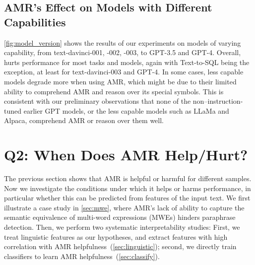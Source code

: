 \begin{figure*}[!bhtp]
\begin{minipage}[t]{0.14\textwidth}
\end{minipage}
\caption{Performance of \basemodel (in purple) and \ourmodel (in red)  on 5 datasets across  5 model versions: text-davinci-001|-002|-003,  GPT-3.5 and GPT-4.} \label{fig:model_version}
\end{figure*}
\subsection{AMR's Effect on Models with Different Capabilities}
\label{sec:model_version}

\cref{fig:model_version} shows the results of our experiments on models of varying capability,
from {text-davinci-001}, {-002}, {-003}, to GPT-3.5 and GPT-4.
Overall, \ourmodel hurts performance for most tasks and models, again with Text-to-SQL being the exception, at least for {text-davinci-003} and GPT-4. In some cases, less capable models degrade more when using AMR, which might be due to their limited ability to comprehend AMR and reason over its special symbols. This is consistent with our preliminary observations that none of the non--instruction-tuned earlier GPT models, or the less capable models such as LLaMa and Alpaca, comprehend AMR or reason over them well. 

\section{Q2: When Does AMR Help/Hurt?}\label{sec:q2}

The previous section shows that AMR is helpful or harmful for different samples.
Now we investigate the conditions under which it helps or harms performance, in particular whether this can be predicted from features of the input text.
We first illustrate a case study in \cref{sec:mwe}, where AMR's lack of ability to capture the semantic equivalence of multi-word expressions (MWEs) hinders paraphrase detection. Then, we perform two systematic interpretability studies: First, we treat linguistic features as our hypotheses, and extract features with high correlation with AMR helpfulness~(\cref{sec:linguistic}); second, we directly train classifiers to learn AMR helpfulness~(\cref{sec:classify}).





